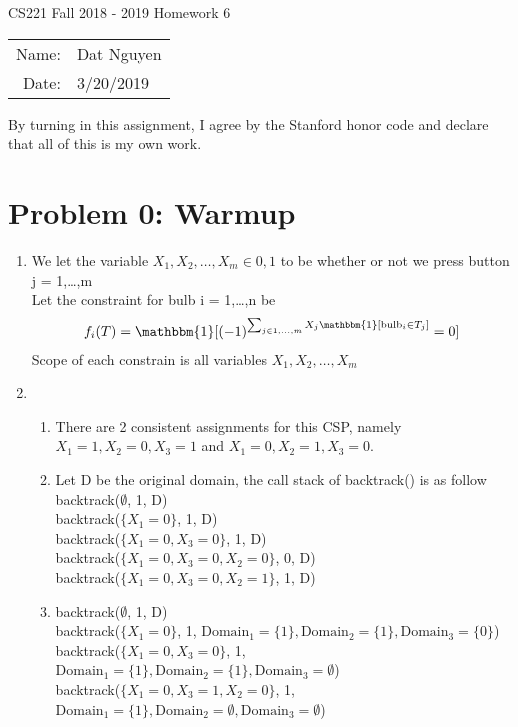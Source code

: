 \documentclass[12pt]{article}
\begin{document}
\begin{center}
{\Large CS221 Fall 2018 - 2019 Homework 6}

\begin{tabular}{rl}     
Name: & Dat Nguyen \\
Date: & 3/20/2019
\end{tabular}
\end{center}
 
 By turning in this assignment, I agree by the Stanford honor code and declare that all of this is my own work.

\section*{Problem 0: Warmup}
\begin{enumerate}[label=(\alph*)]
	\item
	We let the variable $X_1, X_2,\dots, X_m \in {0, 1}$ to be whether or not we press button j = 1,\dots,m \\
	Let the constraint for bulb i = 1,\dots,n be
	\begin{align*} 
		f_i(T) = \mathbbm{1}[(-1)^{\sum_{j \in 1,\dots,m} X_j\mathbbm{1}[\text{bulb}_i \in T_j]} = 0] 
	\end{align*}
	Scope of each constrain is all variables $X_1, X_2,\dots, X_m$

	\item
	\begin{enumerate}[label=\roman*]
	\item
	There are 2 consistent assignments for this CSP, namely $X_1 = 1, X_2 = 0, X_3 = 1$ and $X_1 = 0, X_2 = 1, X_3 = 0$.
	\item
	Let D be the original domain, the call stack of backtrack() is as follow \\
	backtrack($\emptyset$, 1, D) \\
	backtrack($\{X_1 = 0\}$, 1, D) \\
	backtrack($\{X_1 = 0, X_3 = 0\}$, 1, D) \\
	backtrack($\{X_1 = 0, X_3 = 0, X_2 = 0\}$, 0, D) \\
	backtrack($\{X_1 = 0, X_3 = 0, X_2 = 1\}$, 1, D)
	\item
	backtrack($\emptyset$, 1, D) \\
	backtrack($\{X_1 = 0\}$, 1, $\text{Domain}_1 = \{1\}, \text{Domain}_2 = \{1\}, \text{Domain}_3 = \{0\}$) \\
	backtrack($\{X_1 = 0, X_3 = 0\}$, 1, $\text{Domain}_1 = \{1\}, \text{Domain}_2 = \{1\}, \text{Domain}_3 = \emptyset$) \\
	backtrack($\{X_1 = 0, X_3 = 1, X_2 = 0\}$, 1, $\text{Domain}_1 = \{1\}, \text{Domain}_2 = \emptyset, \text{Domain}_3 = \emptyset$) \\

	\end{enumerate}
\end{enumerate}
\end{document}
